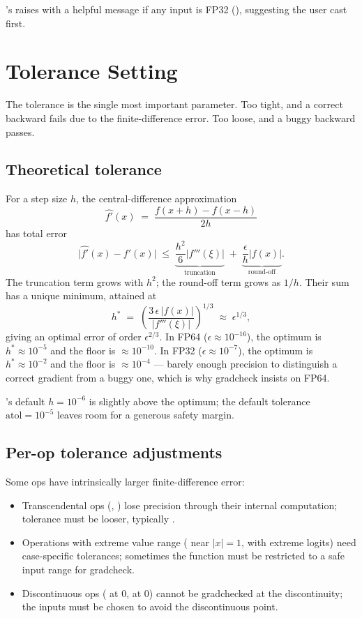 \Lucid's  raises with a helpful message if any
input is FP32 (), suggesting the user cast first.

\section{Tolerance Setting}
\label{sec:gradcheck:tolerance}

The tolerance is the single most important parameter. Too tight,
and a correct backward fails due to the finite-difference error.
Too loose, and a buggy backward passes.

\subsection{Theoretical tolerance}
\label{ssec:gradcheck:theoretical_tol}

For a step size $h$, the central-difference approximation
\[
\widehat{f'}(x) \;=\; \frac{f(x+h) - f(x-h)}{2h}
\]
has total error
\[
\bigl|\widehat{f'}(x) - f'(x)\bigr|
\;\leq\;
\underbrace{\frac{h^2}{6} \bigl|f'''(\xi)\bigr|}_{\text{truncation}}
\;+\;
\underbrace{\frac{\epsilon}{h} \bigl|f(x)\bigr|}_{\text{round-off}}.
\]
The truncation term grows with $h^2$; the round-off term grows
as $1/h$. Their sum has a unique minimum, attained at
\[
h^{*} \;=\; \left(\frac{3\,\epsilon\,|f(x)|}{|f'''(\xi)|}\right)^{1/3}
\;\approx\; \epsilon^{1/3},
\]
giving an optimal error of order $\epsilon^{2/3}$. In FP64
($\epsilon \approx 10^{-16}$), the optimum is $h^* \approx
10^{-5}$ and the floor is $\approx 10^{-10}$. In FP32
($\epsilon \approx 10^{-7}$), the optimum is $h^* \approx
10^{-2}$ and the floor is $\approx 10^{-4}$ --- barely enough
precision to distinguish a correct gradient from a buggy one,
which is why gradcheck insists on FP64.

\Lucid's default $h = 10^{-6}$ is slightly above the optimum; the
default tolerance $\text{atol} = 10^{-5}$ leaves room for a
generous safety margin.

\subsection{Per-op tolerance adjustments}
\label{ssec:gradcheck:per_op_tol}

Some ops have intrinsically larger finite-difference error:

\begin{itemize}
  \item Transcendental ops (, ) lose
    precision through their internal computation; tolerance must
    be looser, typically .
  \item Operations with extreme value range ( near
    $|x|=1$,  with extreme logits) need
    case-specific tolerances; sometimes the function must be
    restricted to a safe input range for gradcheck.
  \item Discontinuous ops ( at 0,  at 0)
    cannot be gradchecked at the discontinuity; the inputs must
    be chosen to avoid the discontinuous point.
\end{itemize}

